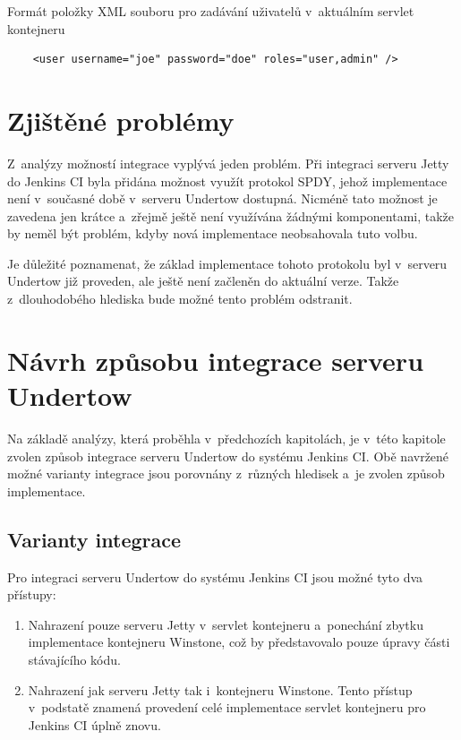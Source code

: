 \begin{priklad} \label{prUsers}
    Formát položky XML souboru pro zadávání uživatelů v~aktuálním servlet kontejneru
\begin{verbatim}
    <user username="joe" password="doe" roles="user,admin" />
\end{verbatim}
\end{priklad}


    \section{Zjištěné problémy} \label{kapSpdy}
        Z~analýzy možností integrace vyplývá jeden problém.
        Při integraci serveru Jetty do Jenkins CI byla přidána
        možnost využít protokol SPDY, jehož implementace
        není v~současné době v~serveru Undertow dostupná. Nicméně tato možnost
        je zavedena jen krátce a~zřejmě ještě není využívána žádnými komponentami,
        takže by neměl být problém, kdyby nová implementace neobsahovala tuto volbu.
        
        Je důležité poznamenat, že základ implementace tohoto protokolu byl
        v~serveru Undertow již proveden, ale ještě není začleněn do aktuální 
        verze. Takže z~dlouhodobého hlediska bude možné tento problém odstranit.

    \section{Návrh způsobu integrace serveru Undertow} \label{secNavrh}
        Na základě analýzy, která proběhla v~předchozích kapitolách,
        je v~této kapitole zvolen způsob
        integrace serveru Undertow do systému Jenkins CI. 
        Obě navržené možné varianty integrace jsou porovnány z~různých
        hledisek a~je zvolen způsob implementace.

                
        \subsection{Varianty integrace}
            Pro integraci serveru Undertow do systému Jenkins CI jsou možné tyto dva přístupy:

            \begin{enumerate}
                \item{Nahrazení pouze serveru Jetty v~servlet kontejneru a~ponechání
                    zbytku implementace kontejneru Winstone, což by představovalo
                    pouze úpravy části stávajícího kódu. }

                \item{Nahrazení jak serveru Jetty tak i~kontejneru Winstone. 
                    Tento přístup v~podstatě znamená provedení celé implementace
                    servlet kontejneru pro Jenkins CI úplně znovu.}
            \end{enumerate}

